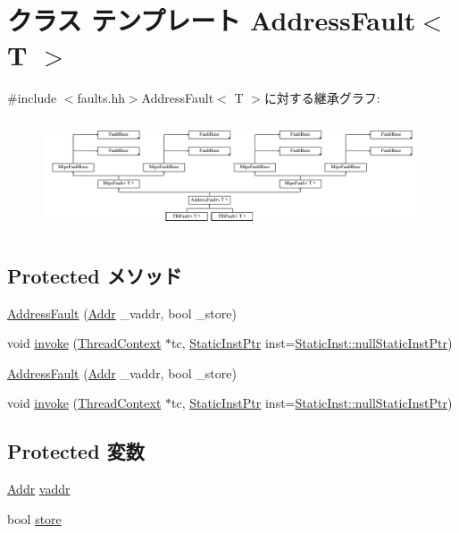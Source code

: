 \hypertarget{classMipsISA_1_1AddressFault}{
\section{クラス テンプレート AddressFault$<$ T $>$}
\label{classMipsISA_1_1AddressFault}
}


{\ttfamily \#include $<$faults.hh$>$}AddressFault$<$ T $>$に対する継承グラフ:\begin{figure}[H]
\begin{center}
\leavevmode
\includegraphics[height=3.33333cm]{classMipsISA_1_1AddressFault}
\end{center}
\end{figure}
\subsection*{Protected メソッド}
\begin{DoxyCompactItemize}
\item 
\hyperlink{classMipsISA_1_1AddressFault_a41d5cd77142b61159baea077490c4101}{AddressFault} (\hyperlink{classm5_1_1params_1_1Addr}{Addr} \_\-vaddr, bool \_\-store)
\item 
void \hyperlink{classMipsISA_1_1AddressFault_a2bd783b42262278d41157d428e1f8d6f}{invoke} (\hyperlink{classThreadContext}{ThreadContext} $\ast$tc, \hyperlink{classRefCountingPtr}{StaticInstPtr} inst=\hyperlink{classStaticInst_aa793d9793af735f09096369fb17567b6}{StaticInst::nullStaticInstPtr})
\item 
\hyperlink{classMipsISA_1_1AddressFault_a41d5cd77142b61159baea077490c4101}{AddressFault} (\hyperlink{classm5_1_1params_1_1Addr}{Addr} \_\-vaddr, bool \_\-store)
\item 
void \hyperlink{classMipsISA_1_1AddressFault_a2bd783b42262278d41157d428e1f8d6f}{invoke} (\hyperlink{classThreadContext}{ThreadContext} $\ast$tc, \hyperlink{classRefCountingPtr}{StaticInstPtr} inst=\hyperlink{classStaticInst_aa793d9793af735f09096369fb17567b6}{StaticInst::nullStaticInstPtr})
\end{DoxyCompactItemize}
\subsection*{Protected 変数}
\begin{DoxyCompactItemize}
\item 
\hyperlink{classm5_1_1params_1_1Addr}{Addr} \hyperlink{classMipsISA_1_1AddressFault_a9f933b300ef63eea367ca82f8da31025}{vaddr}
\item 
bool \hyperlink{classMipsISA_1_1AddressFault_a86c0e52eeb2243d66bc032096c160a0b}{store}
\end{DoxyCompactItemize}
